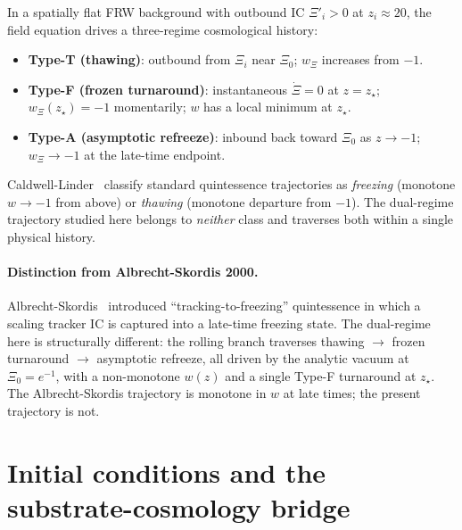 \documentclass[aps,prl,reprint,floatfix,nofootinbib]{revtex4-2}
\newcommand{\Xii}{\Xi_i}
\newcommand{\Xidi}{\Xi'_i}
\newcommand{\zstar}{z_\star}
\begin{document}
In a spatially flat FRW background with outbound IC
$\Xidi > 0$ at $z_i \approx 20$, the field equation drives a
three-regime cosmological history:
\begin{itemize}\setlength\itemsep{0pt}
  \item \textbf{Type-T (thawing)}: outbound from $\Xii$ near
  $\Xi_0$; $w_\Xi$ increases from $-1$.
  \item \textbf{Type-F (frozen turnaround)}: instantaneous
  $\dot\Xi = 0$ at $z = \zstar$; $w_\Xi(\zstar) = -1$
  momentarily; $w$ has a local minimum at $\zstar$.
  \item \textbf{Type-A (asymptotic refreeze)}: inbound back
  toward $\Xi_0$ as $z \to -1$; $w_\Xi \to -1$ at the
  late-time endpoint.
\end{itemize}

Caldwell-Linder~\cite{CaldwellLinder2005} classify standard
quintessence trajectories as \emph{freezing} (monotone $w \to
-1$ from above) or \emph{thawing} (monotone departure from
$-1$). The dual-regime trajectory studied here belongs to
\emph{neither} class and traverses both within a single
physical history.

\paragraph*{Distinction from Albrecht-Skordis 2000.}
Albrecht-Skordis~\cite{AlbrechtSkordis2000} introduced
``tracking-to-freezing'' quintessence in which a scaling
tracker IC is captured into a late-time freezing state.
The dual-regime here is structurally different: the rolling
branch traverses thawing $\to$ frozen turnaround $\to$
asymptotic refreeze, all driven by the analytic vacuum at
$\Xi_0 = e^{-1}$, with a non-monotone $w(z)$ and a single
Type-F turnaround at $\zstar$. The Albrecht-Skordis trajectory
is monotone in $w$ at late times; the present trajectory is
not.

\section{Initial conditions and the substrate-cosmology bridge}\label{sec:ic}
\end{document}
